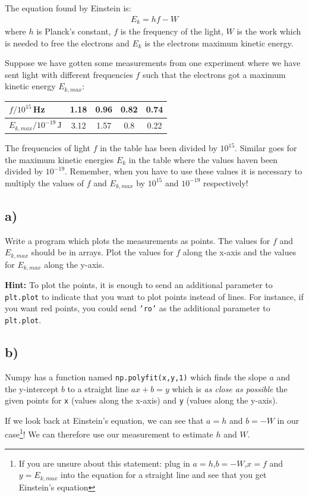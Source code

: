 \documentclass[10pt,a4paper]{article}
\begin{document}
The equation found by Einstein is:
\begin{align*}
	E_k = hf - W 
\end{align*} 
where $h$ is Planck's constant, $f$ is the frequency of the light, $W$ is the work which is needed to free the electrons and $E_k$ is the electrons maximum kinetic energy.  

Suppose we have gotten some measurements from one experiment where we have sent light with different frequencies $f$ such that the electrons got a maximum kinetic energy $E_{k,max}$:
\begin{center}
\begin{tabular}{l|c|c|c|c}
	$f/10^{15}\,$Hz & 1.18 & 0.96 & 0.82 & 0.74 \\ \hline 
	$E_{k,max}/10^{-19}\,\mathrm{J}$ & 3.12 & 1.57 & 0.8 &  0.22
\end{tabular} 
\end{center}
The frequencies of light $f$ in the table has been divided by $10^{15}$. Similar goes for the maximum kinetic energies $E_k$ in the table where the values haven been divided by  $10^{-19}$. Remember, when you have to use these values it is necessary to multiply the values of $f$ and $E_{k,max}$ by   $10^{15}$ and $10^{-19}$ respectively!

\subsection*{a)}
Write a program which plots the measurements as points. The values for $f$ and $E_{k,max}$ should be in arrays. Plot the values for $f$ along the x-axis and the values for $E_{k,max}$  along the y-axis. 

\textbf{Hint:} To plot the points, it is enough to send an additional parameter to \texttt{plt.plot} to indicate that you want to plot points instead of lines. For instance, if you want red points, you could send \texttt{'ro'} as the additional parameter to \texttt{plt.plot}.

\subsection*{b)}
Numpy has a function named \texttt{np.polyfit(x,y,1)} which finds the slope $a$ and the y-intercept $b$ to a straight line $ax + b = y$ which is \textit{as close as possible} the given points for \texttt{x} (values along the x-axis) and \texttt{y} (values along the y-axis). 

If we look back at Einstein's equation, we can see that $a = h$ and $b = -W$ in our case\footnote{If you are unsure about this statement: plug in  $a = h$,$b = -W$,$x = f$ and $y = E_{k,max}$ into the equation for a straight line and see that you get Einstein's equation}! We can therefore use our measurement to estimate $h$ and $W$. 
\end{document}
